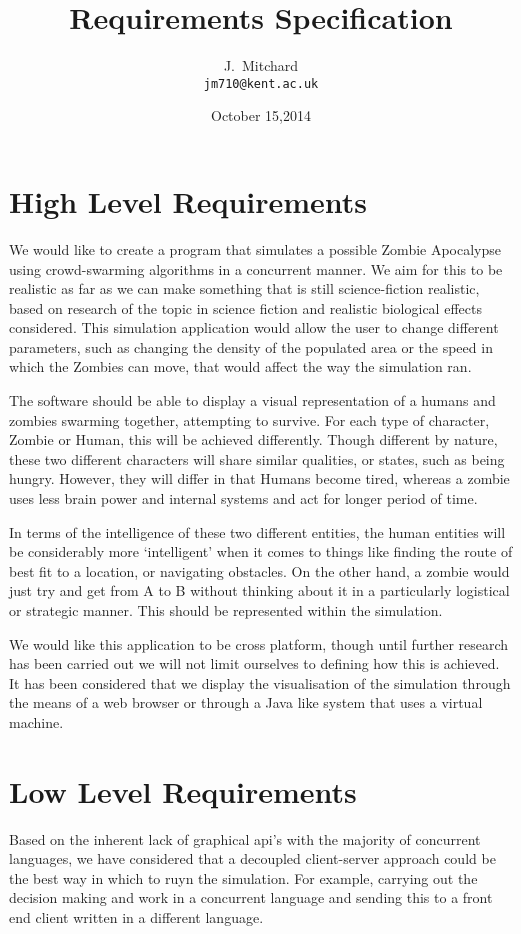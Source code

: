 \documentclass[a4paper,12pt]{article}
\begin{document}
\title{Requirements Specification}
\author{J.~Mitchard\\{\small\tt jm710@kent.ac.uk}}
\date{October 15,2014}

\maketitle

\section{High Level Requirements}
We would like to create a program that simulates a possible Zombie Apocalypse using crowd-swarming algorithms in a concurrent manner. We aim for this to be realistic as far as we can make something that is still science-fiction realistic, based on research of the topic in science fiction and realistic biological effects considered. This simulation application would allow the user to change different parameters, such as changing the density of the populated area or the speed in which the Zombies can move, that would affect the way the simulation ran. 

The software should be able to display a visual representation of a humans and zombies swarming together, attempting to survive. For each type of character, Zombie or Human, this will be achieved differently. Though different by nature, these two different characters will share similar qualities, or states, such as being hungry. However, they will differ in that Humans become tired, whereas a zombie uses less brain power and internal systems and act for longer period of time.

In terms of the intelligence of these two different entities, the human entities will be considerably more ‘intelligent’ when it comes to things like finding the route of best fit to a location, or navigating obstacles. On the other hand, a zombie would just try and get from A to B without thinking about it in a particularly logistical or strategic manner. This should be represented within the simulation.

We would like this application to be cross platform, though until further research has been carried out we will not limit ourselves to defining how this is achieved. It has been considered that we display the visualisation of the simulation through the means of a web browser or through a Java like system that uses a virtual machine.

\section{Low Level Requirements}
Based on the inherent lack of graphical api’s with the majority of concurrent languages, we have considered that a decoupled client-server approach could be the best way in which to ruyn the simulation. For example, carrying out the decision making and work in a concurrent language and sending this to a front end client written in a different language.
\end{document}
